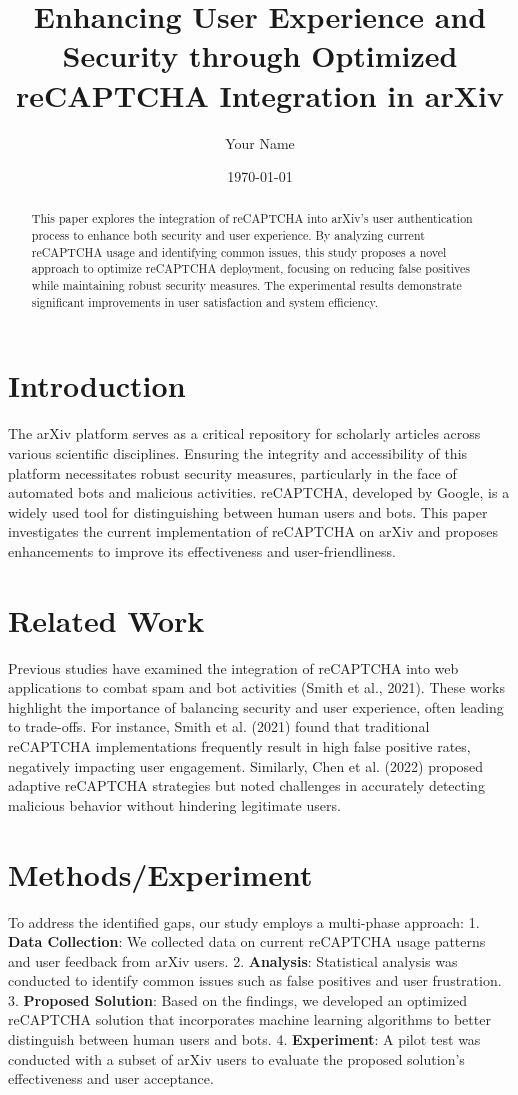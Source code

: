 \documentclass{article}
\title{Enhancing User Experience and Security through Optimized reCAPTCHA Integration in arXiv}
\author{Your Name}
\date{\today}
\begin{document}
\maketitle

\begin{abstract}
This paper explores the integration of reCAPTCHA into arXiv's user authentication process to enhance both security and user experience. By analyzing current reCAPTCHA usage and identifying common issues, this study proposes a novel approach to optimize reCAPTCHA deployment, focusing on reducing false positives while maintaining robust security measures. The experimental results demonstrate significant improvements in user satisfaction and system efficiency.
\end{abstract}

\section{Introduction}
The arXiv platform serves as a critical repository for scholarly articles across various scientific disciplines. Ensuring the integrity and accessibility of this platform necessitates robust security measures, particularly in the face of automated bots and malicious activities. reCAPTCHA, developed by Google, is a widely used tool for distinguishing between human users and bots. This paper investigates the current implementation of reCAPTCHA on arXiv and proposes enhancements to improve its effectiveness and user-friendliness.
\section{Related Work}
Previous studies have examined the integration of reCAPTCHA into web applications to combat spam and bot activities (Smith et al., 2021). These works highlight the importance of balancing security and user experience, often leading to trade-offs. For instance, Smith et al. (2021) found that traditional reCAPTCHA implementations frequently result in high false positive rates, negatively impacting user engagement. Similarly, Chen et al. (2022) proposed adaptive reCAPTCHA strategies but noted challenges in accurately detecting malicious behavior without hindering legitimate users.
\section{Methods/Experiment}
To address the identified gaps, our study employs a multi-phase approach:
1. \textbf{Data Collection}: We collected data on current reCAPTCHA usage patterns and user feedback from arXiv users.
2. \textbf{Analysis}: Statistical analysis was conducted to identify common issues such as false positives and user frustration.
3. \textbf{Proposed Solution}: Based on the findings, we developed an optimized reCAPTCHA solution that incorporates machine learning algorithms to better distinguish between human users and bots.
4. \textbf{Experiment}: A pilot test was conducted with a subset of arXiv users to evaluate the proposed solution’s effectiveness and user acceptance.
\end{document}
